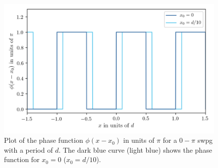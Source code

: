 \begin{figure}
	\centering
	\includegraphics[width=1.0\textwidth]{figures/Two_source/swpg.png}
	\caption{Plot of the phase function $\phi(x-x_0)$ in units of $\pi$ for a $0-\pi$ \gls{swpg} with a period of $d$.  The dark blue curve (light blue) shows the phase function for $x_0 = 0$ ($x_0=d/10$). }
	\label{fig:swpg}
\end{figure}

